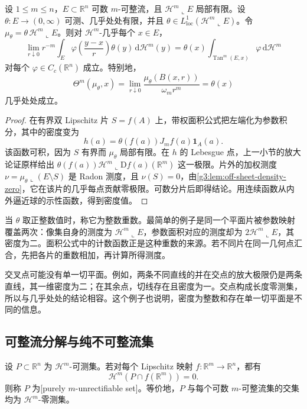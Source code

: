 \begin{theorem}\label{g3:thm:weighted-rectifiable-density}
	设 \(1\le m\le n\)，\(E\subset\mathbb R^n\) 可数 \(m\)-可整流，且 \(\mathcal H^m\llcorner E\) 局部有限。设 \(\theta:E\to(0,\infty)\) 可测、几乎处处有限，并且
	\(\theta\in L^1_{\mathrm{loc}}(\mathcal H^m\llcorner E)\)。令
	\(\mu_\theta=\theta\,\mathcal H^m\llcorner E\)。则对 \(\mathcal H^m\)-几乎每个 \(x\in E\)，
	\begin{equation}\label{g3:eq:weighted-rectifiable-blowup}
		\lim_{r\downarrow0}r^{-m}\int_E
		\varphi\!\left(\frac{y-x}{r}\right)\theta(y)\,\mathrm d\mathcal H^m(y)
		=\theta(x)\int_{\operatorname{Tan}^m(E,x)}
		\varphi\,\mathrm d\mathcal H^m
	\end{equation}
	对每个 \(\varphi\in C_c(\mathbb R^n)\) 成立。特别地，
	\begin{equation}\label{g3:eq:weighted-density-value}
		\Theta^m(\mu_\theta,x)
		=\lim_{r\downarrow0}\frac{\mu_\theta(B(x,r))}{\omega_mr^m}
		=\theta(x)
	\end{equation}
	几乎处处成立。
\end{theorem}
\begin{proof}
	在有界双 Lipschitz 片 \(S=f(A)\) 上，带权面积公式把左端化为参数积分，其中的密度变为
	\[
		h(a)=\theta(f(a))J_mf(a)\mathbf1_A(a).
	\]
	该函数可积，因为 \(S\) 有界而 \(\mu_\theta\) 局部有限。在 \(h\) 的 Lebesgue 点，上一小节的放大论证原样给出
	\(\theta(f(a))\mathcal H^m\llcorner\mathrm Df(a)(\mathbb R^m)\) 这一极限。片外的加权测度
	\(\nu=\mu_\theta\llcorner(E\setminus S)\) 是 Radon 测度，且 \(\nu(S)=0\)，由\cref{g3:lem:off-sheet-density-zero}，它在该片的几乎每点贡献零极限。可数分片后即得结论。用连续函数从内外逼近球的示性函数，得到密度值。
\end{proof}

当 \(\theta\) 取正整数值时，称它为整数重数。最简单的例子是同一个平面片被参数映射覆盖两次：像集自身的测度为 \(\mathcal H^m\llcorner E\)，参数面积对应的测度却为 \(2\mathcal H^m\llcorner E\)，其密度为二。面积公式中的计数函数正是这种重数的来源。若不同片在同一几何点汇合，先把各片的重数相加，再计算所得测度。

\ProseParagraphBreak
交叉点可能没有单一切平面。例如，两条不同直线的并在交点的放大极限仍是两条直线，其一维密度为二；在其余点，切线存在且密度为一。交点构成长度零测集，所以与几乎处处的结论相容。这个例子也说明，密度为整数和存在单一切平面是不同的信息。

\subsection{可整流分解与纯不可整流集}
\label{g3:subsec:2005:04}
\begin{definition}\label{g3:def:purely-unrectifiable-set}
	设 \(P\subset\mathbb R^n\) 为 \(\mathcal H^m\)-可测集。若对每个 Lipschitz 映射 \(f:\mathbb R^m\to\mathbb R^n\)，都有
	\[
		\mathcal H^m(P\cap f(\mathbb R^m))=0.
	\]
	则称 \(P\) 为[purely \(m\)-unrectifiable set]。等价地，\(P\) 与每个可数 \(m\)-可整流集的交集均为 \(\mathcal H^m\)-零测集。
\end{definition}

